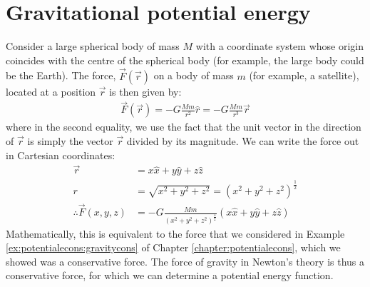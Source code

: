 \section{Gravitational potential energy}
\label{sec:gravity:potentialenergy}
Consider a large spherical body of mass $M$ with a coordinate system whose origin coincides with the centre of the spherical body (for example, the large body could be the Earth). The force, $\vec F(\vec r)$ on a body of mass $m$ (for example, a satellite), located at a position $\vec r$ is then given by:
\begin{align*}
\vec F(\vec r) = - G\frac{Mm}{r^2}\hat r=- G\frac{Mm}{r^3}\vec r
\end{align*}
where in the second equality, we use the fact that the unit vector in the direction of $\vec r$ is simply the vector $\vec r$ divided by its magnitude. We can write the force out in Cartesian coordinates:
\begin{align*}
\vec r &= x\hat x + y \hat y + z\hat z\\
r &= \sqrt{x^2+y^2+z^2} =(x^2+y^2+z^2)^\frac{1}{2} \\
\therefore \vec F(x,y,z) &= - G\frac{Mm}{(x^2+y^2+z^2)^\frac{3}{2} }(x\hat x + y \hat y + z\hat z)
\end{align*}
Mathematically, this is equivalent to the force that we considered in Example \ref{ex:potentialecons:gravitycons} of Chapter \ref{chapter:potentialecons}, which we showed was a conservative force. The force of gravity in Newton's theory is thus a conservative force, for which we can determine a potential energy function.

